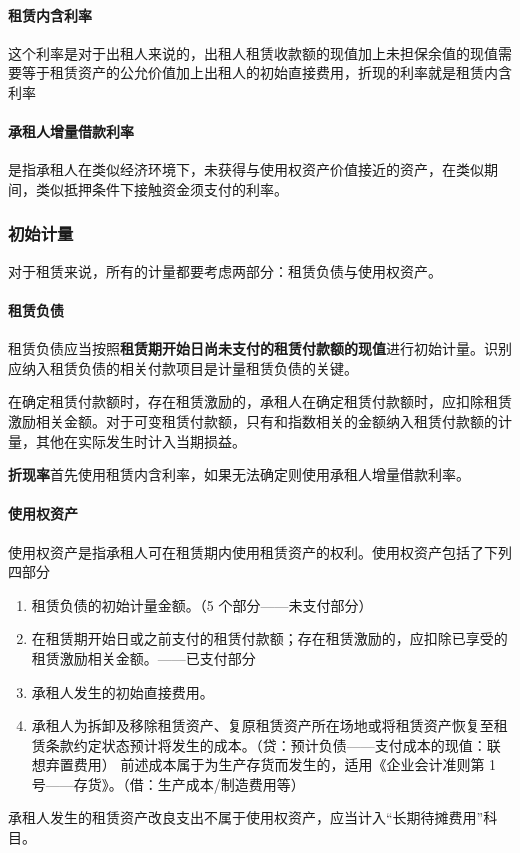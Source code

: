 \documentclass[UTF8,12pt]{ctexart}
\numberwithin{equation}{section} %
\numberwithin{figure}{section}
\numberwithin{table}{section}
\begin{document}
	\paragraph{租赁内含利率}这个利率是对于出租人来说的，出租人租赁收款额的现值加上未担保余值的现值需要等于租赁资产的公允价值加上出租人的初始直接费用，折现的利率就是租赁内含利率
	
	\paragraph{承租人增量借款利率}是指承租人在类似经济环境下，未获得与使用权资产价值接近的资产，在类似期间，类似抵押条件下接触资金须支付的利率。
	
	\subsubsection{初始计量}
	对于租赁来说，所有的计量都要考虑两部分：租赁负债与使用权资产。
	\paragraph{租赁负债}
	租赁负债应当按照\textbf{租赁期开始日尚未支付的租赁付款额的现值}进行初始计量。识别应纳入租赁负债的相关付款项目是计量租赁负债的关键。
	
	在确定租赁付款额时，存在租赁激励的，承租人在确定租赁付款额时，应扣除租赁激励相关金额。对于可变租赁付款额，只有和指数相关的金额纳入租赁付款额的计量，其他在实际发生时计入当期损益。
	
	\textbf{折现率}首先使用租赁内含利率，如果无法确定则使用承租人增量借款利率。
	
	\paragraph{使用权资产}
	使用权资产是指承租人可在租赁期内使用租赁资产的权利。使用权资产包括了下列四部分
	\begin{enumerate}
		\item 租赁负债的初始计量金额。（5 个部分——未支付部分）
		
		\item 在租赁期开始日或之前支付的租赁付款额；存在租赁激励的，应扣除已享受的租赁激励相关金额。——已支付部分
		
		\item 承租人发生的初始直接费用。
		
		\item 承租人为拆卸及移除租赁资产、复原租赁资产所在场地或将租赁资产恢复至租赁条款约定状态预计将发生的成本。（贷：预计负债——支付成本的现值：联想弃置费用）
		前述成本属于为生产存货而发生的，适用《企业会计准则第 1 号——存货》。（借：生产成本/制造费用等） 
	\end{enumerate}
	承租人发生的租赁资产改良支出不属于使用权资产，应当计入“长期待摊费用”科目。
	
\end{document}
